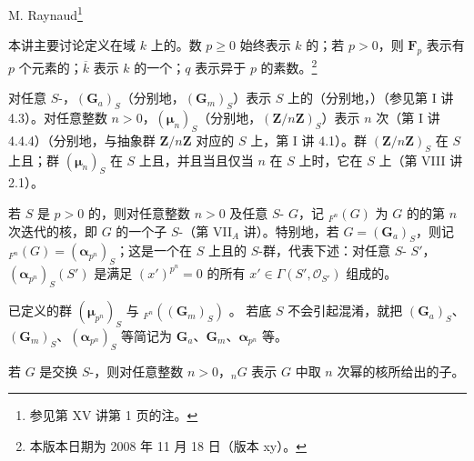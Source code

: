 \begin{center}M. Raynaud\footnote{参见第 XV 讲第 1 页的注。}\end{center}
本讲主要讨论定义在域 $k$ 上的。数 $p\geq0$ 始终表示 $k$ 的；若 $p>0$，则 $\mathbf F_p$ 表示有 $p$ 个元素的；$\overline k$ 表示 $k$ 的一个；$q$ 表示异于 $p$ 的素数。\footnote{本版本日期为 2008 年 11 月 18 日（版本 xy）。}

对任意 $S$-，$(\mathbf G_a)_S$（分别地，$(\mathbf G_m)_S$）表示 $S$ 上的（分别地，）（参见第 I 讲 4.3）。对任意整数 $n>0$，$(\boldsymbol\mu_n)_S$（分别地，$(\mathbf Z/n\mathbf Z)_S$）表示 $n$ 次（第 I 讲 4.4.4）（分别地，与抽象群 $\mathbf Z/n\mathbf Z$ 对应的 $S$ 上，第 I 讲 4.1）。群 $(\mathbf Z/n\mathbf Z)_S$ 在 $S$ 上且；群 $(\boldsymbol\mu_n)_S$ 在 $S$ 上且，并且当且仅当 $n$ 在 $S$ 上时，它在 $S$ 上（第 VIII 讲 2.1）。

若 $S$ 是 $p>0$ 的，则对任意整数 $n>0$ 及任意 $S$- $G$，记 ${}_{F^n}(G)$ 为 $G$ 的的第 $n$ 次迭代的核，即 $G$ 的一个子 $S$-（第 VII$_A$ 讲）。特别地，若 $G=(\mathbf G_a)_S$，则记 ${}_{F^n}(G)=(\boldsymbol\alpha_{p^n})_S$；这是一个在 $S$ 上且的 $S$-群，代表下述：对任意 $S$- $S'$，$(\boldsymbol\alpha_{p^n})_S(S')$ 是满足 $(x')^{p^n}=0$ 的所有 $x'\in\Gamma(S',\mathscr O_{S'})$ 组成的。

已定义的群 $(\boldsymbol\mu_{p^n})_S$ 与 ${}_{F^n}((\mathbf G_m)_S)$ 。
若底 $S$ 不会引起混淆，就把 $(\mathbf G_a)_S$、$(\mathbf G_m)_S$、$(\boldsymbol\alpha_{p^n})_S$ 等简记为 $\mathbf G_a$、$\mathbf G_m$、$\boldsymbol\alpha_{p^n}$ 等。

若 $G$ 是交换 $S$-，则对任意整数 $n>0$，${}_nG$ 表示 $G$ 中取 $n$ 次幂的核所给出的子。

